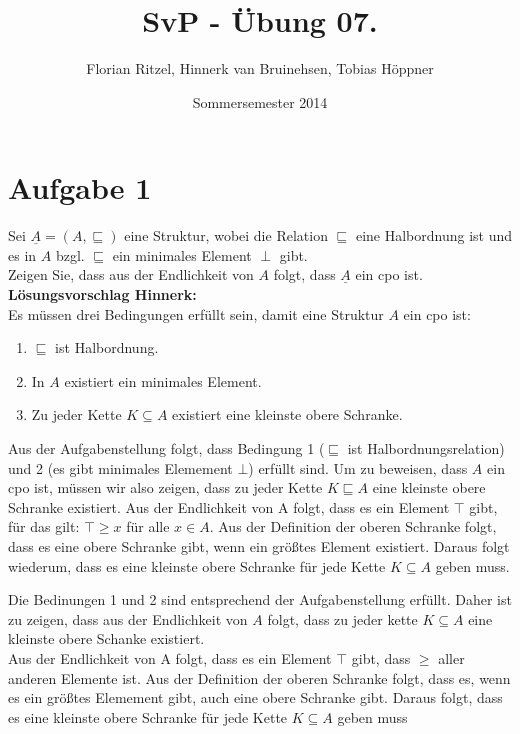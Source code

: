 \documentclass[ngerman,a4paper]{report}
\author{Florian Ritzel, Hinnerk van Bruinehsen, Tobias Höppner}
\title{SvP - Übung 07. }
\date{Sommersemester 2014}
\renewcommand{\maketitle}{}
\begin{document}
\maketitle
\section*{Aufgabe 1}
Sei $\underline{A} = (A,\sqsubseteq)$ eine Struktur, wobei die Relation $\sqsubseteq$ eine Halbordnung ist und es in $A$ bzgl. $\sqsubseteq$ ein minimales Element $\perp$ gibt.\\
Zeigen Sie, dass aus der Endlichkeit von $A$ folgt, dass $\underline{A}$ ein cpo ist.\\

\textbf{Lösungsvorschlag Hinnerk:}\\
Es müssen drei Bedingungen erfüllt sein, damit eine Struktur $A$ ein cpo ist:
\begin{enumerate}
\item $\sqsubseteq$ ist Halbordnung.
\item In $A$ existiert ein minimales Element.
\item Zu jeder Kette $K\subseteq A$ existiert eine kleinste obere Schranke.
\end{enumerate}
Aus der Aufgabenstellung folgt, dass Bedingung 1 ($\sqsubseteq$ ist Halbordnungsrelation) und 2 (es gibt minimales Elemement $\bot$) erfüllt sind.
Um zu beweisen, dass $A$ ein cpo ist, müssen wir also zeigen, dass zu jeder Kette $K\sqsubseteq A$ eine kleinste obere Schranke existiert.
Aus der Endlichkeit von A folgt, dass es ein Element $\top$ gibt, für das gilt: $\top \geq x$ für alle $x \in A$. Aus der Definition der oberen Schranke folgt, dass es eine obere Schranke gibt, wenn ein größtes Element existiert. Daraus folgt wiederum, dass es eine kleinste obere Schranke für jede Kette $K\subseteq A$ geben muss.

Die Bedinungen 1 und 2 sind entsprechend der Aufgabenstellung erfüllt. Daher ist zu zeigen, dass aus der Endlichkeit von $A$ folgt, dass zu jeder kette $K\subseteq A$ eine kleinste obere Schanke existiert.\\

Aus der Endlichkeit von A folgt, dass es ein Element $\top$ gibt, dass $\geq$ aller anderen Elemente ist. Aus der Definition der oberen Schranke folgt, dass es, wenn es ein größtes Elemement gibt, auch eine obere Schranke gibt. Daraus folgt, dass es eine kleinste obere Schranke für jede Kette $K\subseteq A$ geben muss
\end{document}
